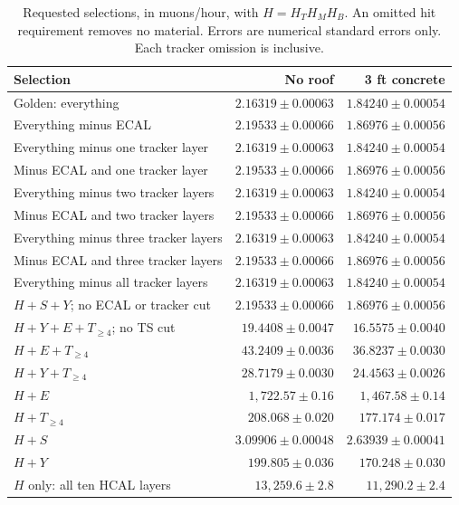 \begin{table}[htbp]
\centering\footnotesize
\caption{Requested selections, in muons/hour, with $H=H_TH_MH_B$. An omitted hit requirement removes no material. Errors are numerical standard errors only. Each tracker omission is inclusive.}\label{tab:principal}
\begin{tabular}{lrr}
\toprule
Selection & No roof & 3 ft concrete\\
\midrule
Golden: everything & $2.16319\pm0.00063$ & $1.84240\pm0.00054$\\
Everything minus ECAL & $2.19533\pm0.00066$ & $1.86976\pm0.00056$\\
Everything minus one tracker layer & $2.16319\pm0.00063$ & $1.84240\pm0.00054$\\
Minus ECAL and one tracker layer & $2.19533\pm0.00066$ & $1.86976\pm0.00056$\\
Everything minus two tracker layers & $2.16319\pm0.00063$ & $1.84240\pm0.00054$\\
Minus ECAL and two tracker layers & $2.19533\pm0.00066$ & $1.86976\pm0.00056$\\
Everything minus three tracker layers & $2.16319\pm0.00063$ & $1.84240\pm0.00054$\\
Minus ECAL and three tracker layers & $2.19533\pm0.00066$ & $1.86976\pm0.00056$\\
Everything minus all tracker layers & $2.16319\pm0.00063$ & $1.84240\pm0.00054$\\
$H+S+Y$; no ECAL or tracker cut & $2.19533\pm0.00066$ & $1.86976\pm0.00056$\\
$H+Y+E+T_{\ge4}$; no TS cut & $19.4408\pm0.0047$ & $16.5575\pm0.0040$\\
$H+E+T_{\ge4}$ & $43.2409\pm0.0036$ & $36.8237\pm0.0030$\\
$H+Y+T_{\ge4}$ & $28.7179\pm0.0030$ & $24.4563\pm0.0026$\\
$H+E$ & $1,722.57\pm0.16$ & $1,467.58\pm0.14$\\
$H+T_{\ge4}$ & $208.068\pm0.020$ & $177.174\pm0.017$\\
$H+S$ & $3.09906\pm0.00048$ & $2.63939\pm0.00041$\\
$H+Y$ & $199.805\pm0.036$ & $170.248\pm0.030$\\
$H$ only: all ten HCAL layers & $13,259.6\pm2.8$ & $11,290.2\pm2.4$\\
\bottomrule
\end{tabular}
\end{table}
